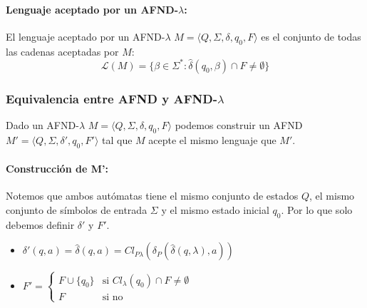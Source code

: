 \paragraph{Lenguaje aceptado por un AFND-\(\lambda\):} El lenguaje aceptado por un AFND-\(\lambda\) \(M =\langle Q,\Sigma,\delta,q_0,F\rangle\) es el conjunto de todas las cadenas aceptadas por \(M\):
\[\mathcal{L}(M) = \{\beta \in \Sigma^* : \hat\delta(q_0,\beta)\cap F \neq \emptyset\}\]

\subsubsection{Equivalencia entre AFND y AFND-\texorpdfstring{\(\lambda\)}{lambda}}
\label{sec:afd-afd-lambda}
Dado un AFND-\(\lambda\) \(M =\langle Q,\Sigma,\delta,q_0,F\rangle\) podemos construir un AFND \(M' =\langle Q,\Sigma,\delta',q_0,F'\rangle\) tal que \(M\) acepte el mismo lenguaje que \(M'\).

\paragraph{Construcción de M':} Notemos que ambos autómatas tiene el mismo conjunto de estados \(Q\), el mismo conjunto de símbolos de entrada \(\Sigma\) y el mismo estado inicial \(q_0\). Por lo que solo debemos definir \(\delta'\) y \(F'\).
\begin{itemize}
  \item \(\delta'(q,a) = \hat\delta(q, a) = Cl_{P\lambda}\left(\delta_P(\hat\delta(q,\lambda), a)\right)\)
  \item \(
        F' = \begin{cases}
          F\cup\{q_0\} & \text{si } Cl_{\lambda}(q_0)\cap F \neq \emptyset \\
          F            & \text{si no}
        \end{cases}\)
\end{itemize}


